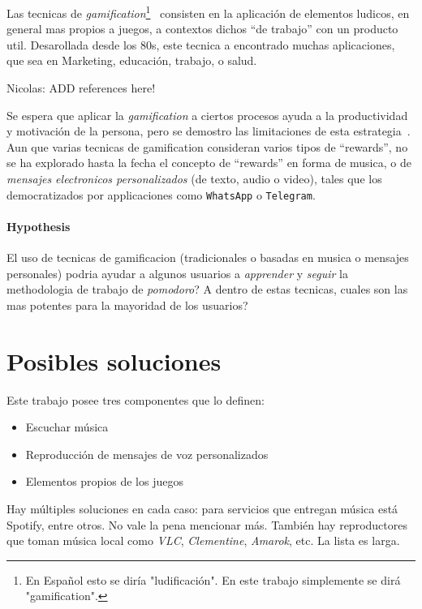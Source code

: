 \documentclass[12pt,letterpaper]{report}
\providecommand{\tightlist}{%
  \setlength{\itemsep}{0pt}\setlength{\parskip}{0pt}}
\let\oldparagraph\paragraph
\renewcommand{\paragraph}[1]{\oldparagraph{#1}\mbox{}}
\begin{document}
Las tecnicas de \emph{gamification}\footnote{En Español esto se diría "ludificación". En este trabajo simplemente se dirá "gamification".}~\cite{deterding2011gamification} consisten en la aplicación de elementos ludicos, en general mas propios a juegos, a contextos dichos ``de trabajo'' con un producto util.  Desarollada desde los 80s, este tecnica a encontrado muchas aplicaciones, que sea en Marketing, educación, trabajo, o salud.
\begin{TODO}
Nicolas: ADD references here!
\end{TODO}
Se espera que aplicar la \emph{gamification} a ciertos procesos ayuda a la productividad y motivación de la persona, pero se demostro las limitaciones de esta estrategia~\cite{hamari2014gamification}.
%
Aun que varias tecnicas de gamification consideran varios tipos de ``rewards'', no se ha explorado hasta la fecha el concepto de ``rewards'' en forma de musica, o de \emph{mensajes electronicos personalizados} (de texto, audio o video), tales que los democratizados por applicaciones como \texttt{WhatsApp} o \texttt{Telegram}.

\paragraph{Hypothesis}
El uso de tecnicas de gamificacion (tradicionales o basadas en musica o mensajes personales) podria ayudar a algunos usuarios a \emph{apprender} y \emph{seguir} la methodologia de trabajo de \emph{pomodoro}?
A dentro de estas tecnicas, cuales son las mas potentes para la mayoridad de los usuarios?

\newpage
\hypertarget{posibles-soluciones}{%
\section{Posibles soluciones}\label{posibles-soluciones}}

Este trabajo posee tres componentes que lo definen:

\begin{itemize}
\tightlist
\item
  Escuchar música
\item
  Reproducción de mensajes de voz personalizados
\item
  Elementos propios de los juegos
\end{itemize}

Hay múltiples soluciones en cada caso: para servicios que entregan
música está Spotify, entre otros. No vale la pena mencionar más. También
hay reproductores que toman música local como \emph{VLC},
\emph{Clementine}, \emph{Amarok}, etc. La lista es larga.
\end{document}
